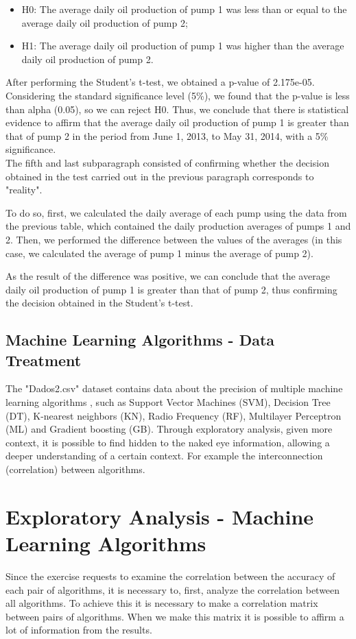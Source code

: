 \documentclass[conference]{IEEEtran}
\begin{document}
\begin{itemize}
    \item H0: The average daily oil production of pump 1 was less than or equal to the average daily oil production of pump 2;
    \item H1: The average daily oil production of pump 1 was higher than the average daily oil production of pump 2.
\end{itemize}

After performing the Student's t-test, we obtained a p-value of 2.175e-05.
Considering the standard significance level (5\%), we found that the p-value is less than alpha (0.05), so we can reject H0.
Thus, we conclude that there is statistical evidence to affirm that the average daily oil production of pump 1 is greater than that of pump 2 in the period from June 1, 2013, to May 31, 2014, with a 5\% significance.\\

The fifth and last subparagraph consisted of confirming whether the decision obtained in the test carried out in the previous paragraph corresponds to "reality".

To do so, first, we calculated the daily average of each pump using the data from the previous table, which contained the daily production averages of pumps 1 and 2. Then, we performed the difference between the values of the averages (in this case, we calculated the average of pump 1 minus the average of pump 2).

As the result of the difference was positive, we can conclude that the average daily oil production of pump 1 is greater than that of pump 2, thus confirming the decision obtained in the Student's t-test.

\subsection{Machine Learning Algorithms - Data Treatment}
The "Dados2.csv" dataset contains data about the precision of multiple machine learning algorithms , such as Support Vector Machines (SVM), Decision Tree (DT), K-nearest neighbors (KN), Radio Frequency (RF), Multilayer Perceptron (ML) and Gradient boosting (GB).
Through exploratory analysis, given more context, it is possible to find hidden to the naked eye information, allowing a deeper understanding of a certain context. For example the interconnection (correlation) between algorithms.

\section{Exploratory Analysis - Machine Learning Algorithms}
Since the exercise requests to examine the correlation between the accuracy of each pair of algorithms, it is necessary to, first, analyze the correlation between all algorithms. To achieve this it is necessary to make a correlation matrix between pairs of algorithms. When we make this matrix it is possible to affirm a lot of information from the results.
\end{document}
